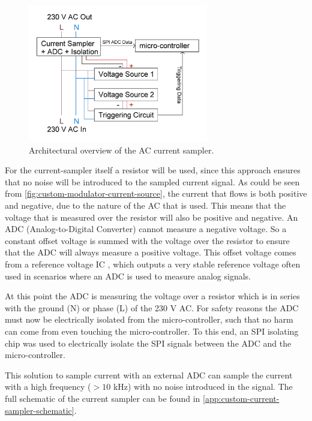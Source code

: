 \begin{figure}[h]
	\centering
	\includegraphics[angle=0,width=0.7\textwidth,keepaspectratio]{chapters/hardware-chapters/AC/ac-current-sampler/ac-current-sampler-architectural.JPG}
	\caption{Architectural overview of the AC current sampler.}
	\label{fig:ac-current-sampler-architectural}
\end{figure}


For the current-sampler itself a resistor will be used, since this approach ensures that no noise will be introduced to the sampled current signal.
As could be seen from \autoref{fig:custom-modulator-current-source}, the current that flows is both positive and negative, due to the nature of the AC that is used.
This means that the voltage that is measured over the resistor will also be positive and negative.
An ADC (Analog-to-Digital Converter) cannot measure a negative voltage.
So a constant offset voltage is summed with the voltage over the resistor to ensure that the ADC will always measure a positive voltage.
This offset voltage comes from a reference voltage IC \cite{lm336z-ref-voltage-datasheet}, which outputs a very stable reference voltage often used in scenarios where an ADC is used to measure analog signals.

At this point the ADC is measuring the voltage over a resistor which is in series with the ground (N) or phase (L) of the 230 V AC.
For safety reasons the ADC must now be electrically isolated from the micro-controller, such that no harm can come from even touching the micro-controller.
To this end, an SPI isolating chip was used \cite{iso7241m-spi-isolator-datasheet} to electrically isolate the SPI signals between the ADC and the micro-controller.




This solution to sample current with an external ADC can sample the current with a high frequency ($> 10$ kHz) with no noise introduced in the signal.
The full schematic of the current sampler can be found in \autoref{app:custom-current-sampler-schematic}.



